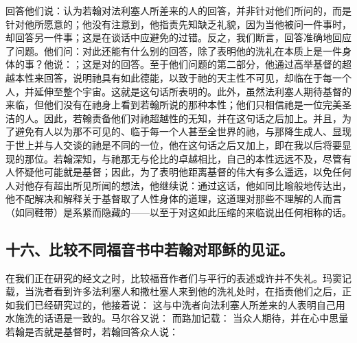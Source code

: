 回答他们说：认为若翰对法利塞人所差来的人的回答，并非针对他们所问的，而是针对他所愿意的；他没有注意到，他指责先知缺乏礼貌，因为当他被问一件事时，却回答另一件事；这是在谈话中应避免的过错。反之，我们断言，回答准确地回应了问题。他们问：对此还能有什么别的回答，除了表明他的洗礼在本质上是一件身体的事？他说：；这是对的回答。至于他们问题的第二部分，他通过高举基督的超越本性来回答，说明祂具有如此德能，以致于祂的天主性不可见，却临在于每一个人，并延伸至整个宇宙。这就是这句话所表明的。此外，虽然法利塞人期待基督的来临，但他们没有在祂身上看到若翰所说的那种本性；他们只相信祂是一位完美圣洁的人。因此，若翰责备他们对祂超越性的无知，并在这句话之后加上。并且，为了避免有人以为那不可见的、临于每一个人甚至全世界的祂，与那降生成人、显现于世上并与人交谈的祂是不同的一位，他在这句话之后又加上，即在我以后将要显现的那位。若翰深知，与祂那无与伦比的卓越相比，自己的本性远远不及，尽管有人怀疑他可能就是基督；因此，为了表明他距离基督的伟大有多么遥远，以免任何人对他存有超出所见所闻的想法，他继续说：通过这话，他如同比喻般地传达出，他不配解决和解释关于基督取了人性身体的道理，这道理对那些不理解的人而言（如同鞋带）是系紧而隐藏的——以至于对这如此压缩的来临说出任何相称的话。\par


\subsection{十六、比较不同福音书中若翰对耶稣的见证。}

在我们正在研究的经文之时，比较福音作者们与平行的表述或许并不失礼。玛窦记载，当洗者看到许多法利塞人和撒杜塞人来到他的洗礼处时，在指责他们之后，正如我们已经研究过的，他接着说： 这与中洗者向法利塞人所差来的人表明自己用水施洗的话语是一致的。马尔谷又说： 而路加记载： 当众人期待，并在心中思量若翰是否就是基督时，若翰回答众人说：\par

